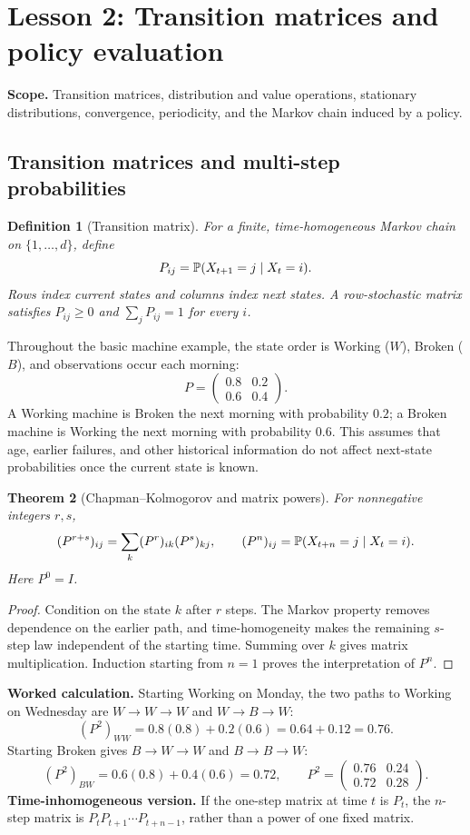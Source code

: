 \documentclass[11pt]{article}
\newtheorem{definition}{Definition}[section]
\newtheorem{theorem}[definition]{Theorem}
\theoremstyle{remark}\newtheorem{remark}[definition]{Remark}
\begin{document}
\clearpage
{}
\section{Lesson 2: Transition matrices and policy evaluation}
\textbf{Scope.} Transition matrices, distribution and value operations, stationary distributions, convergence, periodicity, and the Markov chain induced by a policy.

\subsection{Transition matrices and multi-step probabilities}
\begin{definition}[Transition matrix]
For a finite, time-homogeneous Markov chain on $\{1,\ldots,d\}$, define
\[
P_{ij}=\mathbb P(X_{t+1}=j\mid X_t=i).
\]
Rows index current states and columns index next states. A row-stochastic matrix satisfies $P_{ij}\geq0$ and $\sum_jP_{ij}=1$ for every $i$.
\end{definition}
Throughout the basic machine example, the state order is Working ($W$), Broken ($B$), and observations occur each morning:
\[
P=\begin{pmatrix}0.8&0.2\\0.6&0.4\end{pmatrix}.
\]
A Working machine is Broken the next morning with probability $0.2$; a Broken machine is Working the next morning with probability $0.6$. This assumes that age, earlier failures, and other historical information do not affect next-state probabilities once the current state is known.

\begin{theorem}[Chapman--Kolmogorov and matrix powers]
For nonnegative integers $r,s$,
\[
(P^{r+s})_{ij}=\sum_k(P^r)_{ik}(P^s)_{kj},\qquad
(P^n)_{ij}=\mathbb P(X_{t+n}=j\mid X_t=i).
\]
Here $P^0=I$.
\end{theorem}
\begin{proof}
Condition on the state $k$ after $r$ steps. The Markov property removes dependence on the earlier path, and time-homogeneity makes the remaining $s$-step law independent of the starting time. Summing over $k$ gives matrix multiplication. Induction starting from $n=1$ proves the interpretation of $P^n$.
\end{proof}
\textbf{Worked calculation.} Starting Working on Monday, the two paths to Working on Wednesday are $W\to W\to W$ and $W\to B\to W$:
\[
(P^2)_{WW}=0.8(0.8)+0.2(0.6)=0.64+0.12=0.76.
\]
Starting Broken gives $B\to W\to W$ and $B\to B\to W$:
\[
(P^2)_{BW}=0.6(0.8)+0.4(0.6)=0.72,
\qquad P^2=\begin{pmatrix}0.76&0.24\\0.72&0.28\end{pmatrix}.
\]
\textbf{Time-inhomogeneous version.} If the one-step matrix at time $t$ is $P_t$, the $n$-step matrix is $P_tP_{t+1}\cdots P_{t+n-1}$, rather than a power of one fixed matrix.
\end{document}
